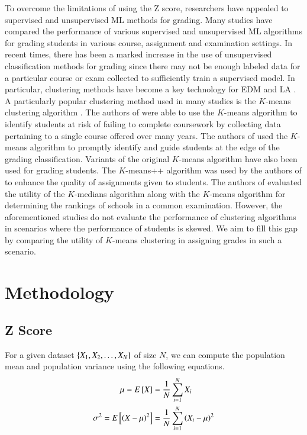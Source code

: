 \documentclass[conference]{IEEEtran}
\begin{document}
To overcome the limitations of using the Z score, researchers have appealed to
supervised and unsupervised ML methods for grading. Many studies
\cite{badalPredictiveModellingAnalytics2023,
palkhiwalaAnalysisMachineLearning2022, bujangMulticlassPredictionModel2021,
gullImprovingLearningExperience2020} have compared the performance of various
supervised and unsupervised ML algorithms for grading students in various
course, assignment and examination settings. In recent times, there has been a
marked increase in the use of unsupervised classification methods for grading
since there may not be enough labeled data for a particular course or exam
collected to sufficiently train a supervised model. In particular, clustering
methods have become a key technology for EDM and LA
\cite{zhangBriefAnalysisKey2018}. A particularly popular clustering method used
in many studies is the $K$-means clustering algorithm
\cite{macqueenMethodsClassificationAnalysis1967}. The authors of
\cite{bucosStudentClusterAnalysis2020} were able to use the $K$-means algorithm
to identify students at risk of failing to complete coursework by collecting
data pertaining to a single course offered over many years. The authors of
\cite{wangAlgorithmStudentGrade2022} used the $K$-means algorithm to promptly
identify and guide students at the edge of the grading classification. Variants
of the original $K$-means algorithm have also been used for grading students.
The $K$-means++ algorithm was used by the authors of
\cite{jimenez-maciasStudentClusteringKMeans2024} to enhance the quality of
assignments given to students. The authors of
\cite{bhartiCentroidBasedClustering2024} evaluated the utility of the
$K$-medians algorithm along with the $K$-means algorithm for determining the
rankings of schools in a common examination. However, the aforementioned studies
do not evaluate the performance of clustering algorithms in scenarios where the
performance of students is skewed. We aim to fill this gap by comparing the
utility of $K$-means clustering in assigning grades in such a scenario.

\section{Methodology}
\label{sec:methodology}

\subsection{Z Score}
For a given dataset $\left\{X_1, X_2, \ldots, X_N\right\}$ of size $N$, we can compute
the population mean and population variance using the following equations.
\begin{align}
    \mu = E\left[ X \right] &= \frac{1}{N}\sum_{i=1}^N X_i \\
    \sigma^2 = E\left[ \left(X-\mu\right)^2 \right] &= \frac{1}{N}\sum_{i=1}^N\left(X_i-\mu\right)^2
    \label{eq:pop-param}
\end{align}
\end{document}
